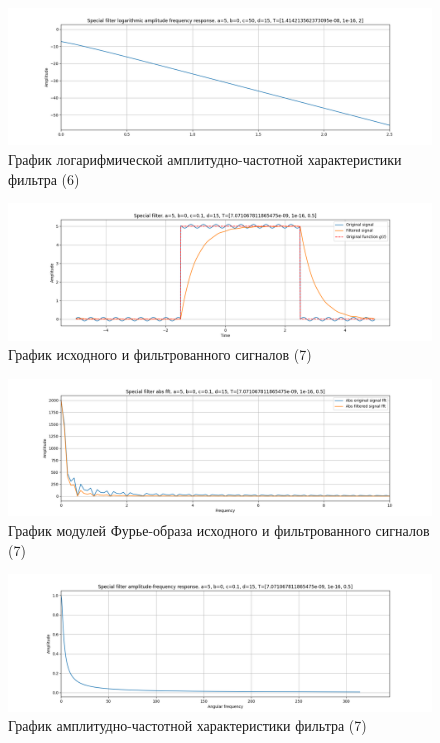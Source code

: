 \documentclass[a4paper, 12pt]{article}
\begin{document}
    \begin{figure}[H]
        \centering
        \includegraphics[scale=0.4]{6_fl2_lafr.png}
        \captionsetup{skip=0pt}
        \caption{График логарифмической амплитудно-частотной характеристики фильтра (6)}
        \label{fig:filinlafr26}
    \end{figure}
    \begin{figure}[H]
        \centering
        \includegraphics[scale=0.4]{7_fl2.png}
        \captionsetup{skip=0pt}
        \caption{График исходного и фильтрованного сигналов (7)}
        \label{fig:filin27}
    \end{figure}
    \begin{figure}[H]
        \centering
        \includegraphics[scale=0.4]{7_fl2_abs.png}
        \captionsetup{skip=0pt}
        \caption{График модулей Фурье-образа исходного и фильтрованного сигналов (7)}
        \label{fig:filinabs27}
    \end{figure}
    \begin{figure}[H]
        \centering
        \includegraphics[scale=0.4]{7_fl2_afr.png}
        \captionsetup{skip=0pt}
        \caption{График амплитудно-частотной характеристики фильтра (7)}
        \label{fig:filinafr27}
    \end{figure}
\end{document}
